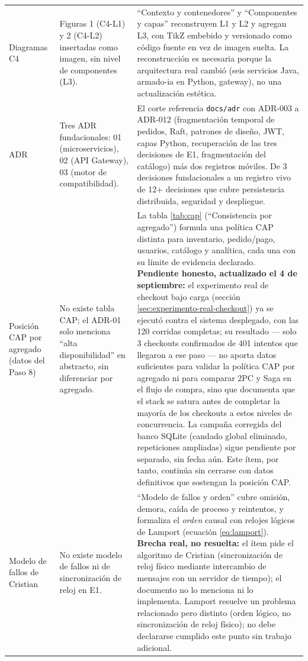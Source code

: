 \documentclass[12pt,a4paper]{article}
\begin{document}
\begin{longtable}{>{\raggedright\arraybackslash}p{2.9cm}>{\raggedright\arraybackslash}p{5.5cm}>{\raggedright\arraybackslash}p{6.2cm}}
2.4 Diagramas C4 &
Figuras 1 (C4-L1) y 2 (C4-L2) insertadas como imagen, sin nivel de componentes (L3). &
``Contexto y contenedores'' y ``Componentes y capas'' reconstruyen L1 y L2 y agregan L3, con TikZ embebido y versionado como código fuente en vez de imagen suelta. La reconstrucción es necesaria porque la arquitectura real cambió (seis servicios Java, armado-ia en Python, gateway), no una actualización estética.\\

2.5 ADR &
Tres ADR fundacionales: 01 (microservicios), 02 (API Gateway), 03 (motor de compatibilidad). &
El corte referencia \texttt{docs/adr} con ADR-003 a ADR-012 (fragmentación temporal de pedidos, Raft, patrones de diseño, JWT, capas Python, recuperación de las tres decisiones de E1, fragmentación del catálogo) más dos registros móviles. De 3 decisiones fundacionales a un registro vivo de 12+ decisiones que cubre persistencia distribuida, seguridad y despliegue.\\

2.6 Posición CAP por agregado (datos del Paso 8) &
No existe tabla CAP; el ADR-01 solo menciona ``alta disponibilidad'' en abstracto, sin diferenciar por agregado. &
La tabla \ref{tab:cap} (``Consistencia por agregado'') formula una política CAP distinta para inventario, pedido/pago, usuarios, catálogo y analítica, cada una con su límite de evidencia declarado. \textbf{Pendiente honesto, actualizado el 4 de septiembre:} el experimento real de checkout bajo carga (sección \ref{sec:experimento-real-checkout}) ya se ejecutó contra el sistema desplegado, con las 120 corridas completas; su resultado --- solo 3 checkouts confirmados de 401 intentos que llegaron a ese paso --- no aporta datos suficientes para validar la política CAP por agregado ni para comparar 2PC y Saga en el flujo de compra, sino que documenta que el stack se satura antes de completar la mayoría de los checkouts a estos niveles de concurrencia. La campaña corregida del banco SQLite (candado global eliminado, repeticiones ampliadas) sigue pendiente por separado, sin fecha aún. Este ítem, por tanto, continúa sin cerrarse con datos definitivos que sostengan la posición CAP.\\

2.7 Modelo de fallos de Cristian &
No existe modelo de fallos ni de sincronización de reloj en E1. &
``Modelo de fallos y orden'' cubre omisión, demora, caída de proceso y reintentos, y formaliza el \emph{orden} causal con relojes lógicos de Lamport (ecuación \ref{eq:lamport}). \textbf{Brecha real, no resuelta:} el ítem pide el algoritmo de Cristian (sincronización de reloj físico mediante intercambio de mensajes con un servidor de tiempo); el documento no lo menciona ni lo implementa. Lamport resuelve un problema relacionado pero distinto (orden lógico, no sincronización de reloj físico); no debe declararse cumplido este punto sin trabajo adicional.\\


\end{longtable}
\end{document}
